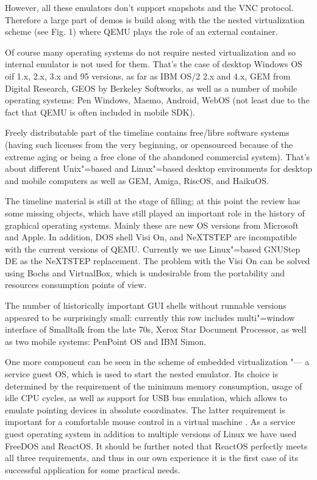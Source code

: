 \documentclass[10pt, a5paper]{article}
\begin{document}
However, all these emulators don't support snapshots and the VNC protocol. Therefore a large part of demos is build along with the the nested virtualization scheme (see Fig. 1) where QEMU plays the role of an external container. 

Of course many operating systems do not require nested virtualiza\-tion and so internal emulator is not used for them. That's the case of desktop Windows OS oif 1.x, 2.x, 3.x and 95 versions, as far as IBM OS/2 2.x and 4.x, GEM from Digital Research, GEOS by Berkeley Softworks, as well as a number of mobile operating systems: Pen \linebreak Windows, Maemo, Android, WebOS (not least due to the fact that QEMU is often included in mobile SDK).

Freely distributable part of the timeline contains free/libre software systems (having such licenses from the very beginning, or opensourced because of the extreme aging or being a free clone of the abandoned commercial system). That's about different Unix"=based and Linux"=based desktop environments for desktop and mobile computers as well as GEM, Amiga, RiscOS, and HaikuOS.

The timeline material is still at the stage of filling; at this point the review has some missing objects, which have still played an important role in the history of graphical operating systems. Mainly these are new OS versions from Microsoft and Apple. In addition, DOS shell Visi On, and NeXTSTEP are incompatible with the current versions of QEMU. Currently we use Linux"=based GNUStep DE as the NeXTSTEP replacement. The problem with the Visi On can be solved using Bochs and VirtualBox, which is undesirable from the portability and resources consumption points of view.

The number of historically important GUI shells without runnable versions  appeared to be surprisingly small: currently this row includes multi"=window interface of Smalltalk from the late 70s, Xerox Star \linebreak Document Processor, as well as two mobile systems: PenPoint OS and IBM Simon. 

One more component can be seen in the scheme of embedded virtua\-lization "--- a service guest OS, which is used to start the nested emulator. Its choice is determined by the requirement of the minimum memory consumption, usage of idle CPU cycles, as well as support for USB bus emulation, which allows to emulate pointing devices in absolute coordinates. The latter requirement is important for a comfortable mouse control in a virtual machine \cite{kostiuk1}. As a service guest operating system in addition to multiple versions of Linux we have used FreeDOS and ReactOS. It should be further noted that ReactOS perfectly meets all three requirements, and thus in our own experience it is the first case of its successful application for some practical needs.
\end{document}
